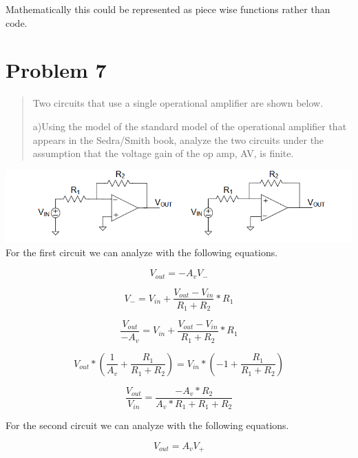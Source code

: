 \documentclass[10pt,a4paper]{article}
\begin{document}
Mathematically this could be represented as piece wise functions rather than code.


\section{Problem 7}
\begin{quote}

Two circuits that use a single operational amplifier are shown below.

a)Using the model of the standard model of the operational amplifier
that appears in the Sedra/Smith book, analyze the two circuits under the
assumption that the voltage gain of the op amp, AV, is finite.
\end{quote}
\includegraphics[width=6in]{images/problem7.png}\\

For the first circuit we can analyze with the following equations.

\begin{equation}
V_{out} = -A_v V_-
\end{equation}

\begin{equation}
V_- =  V_{in} + \frac{V_{out} - V_{in}}{R_1 + R_2} * R_1
\end{equation}

\begin{equation}
\frac{V_{out}}{-A_v} = V_{in} + \frac{V_{out} - V_{in}}{R_1 + R_2} * R_1
\end{equation}

\begin{equation}
V_{out} * (\frac{1}{A_v} + \frac{R_1}{R_1 +R_2}) = V_{in} * ( -1 + \frac{R_1}{R_1 + R_2})
\end{equation}

\begin{equation}
\frac{V_{out}}{V_{in}} =  \frac{-A_v *R_2}{A_v *R_1 + R_1 + R_2}
\end{equation}

For the second circuit we can analyze with the following equations.

\begin{equation}
V_{out} = A_v V_+ 
\end{equation}
\end{document}
